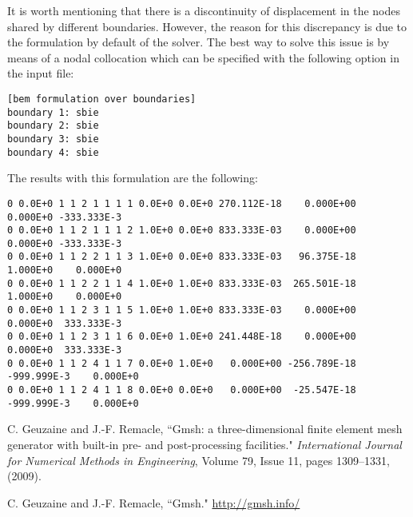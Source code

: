 \documentclass[A4]{article}
\begin{document}
It is worth mentioning that there is a discontinuity of displacement in the nodes shared by different boundaries. However, the reason for this discrepancy is due to the formulation by default of the solver. The best way to solve this issue is by means of a nodal collocation which can be specified with the following option in the input file: 

\begin{Verbatim}
[bem formulation over boundaries]
boundary 1: sbie
boundary 2: sbie
boundary 3: sbie
boundary 4: sbie
\end{Verbatim}

The results with this formulation are the following:

\begin{Verbatim}
0 0.0E+0 1 1 2 1 1 1 1 0.0E+0 0.0E+0 270.112E-18    0.000E+00    0.000E+0 -333.333E-3
0 0.0E+0 1 1 2 1 1 1 2 1.0E+0 0.0E+0 833.333E-03    0.000E+00    0.000E+0 -333.333E-3
0 0.0E+0 1 1 2 2 1 1 3 1.0E+0 0.0E+0 833.333E-03   96.375E-18    1.000E+0    0.000E+0
0 0.0E+0 1 1 2 2 1 1 4 1.0E+0 1.0E+0 833.333E-03  265.501E-18    1.000E+0    0.000E+0
0 0.0E+0 1 1 2 3 1 1 5 1.0E+0 1.0E+0 833.333E-03    0.000E+00    0.000E+0  333.333E-3
0 0.0E+0 1 1 2 3 1 1 6 0.0E+0 1.0E+0 241.448E-18    0.000E+00    0.000E+0  333.333E-3
0 0.0E+0 1 1 2 4 1 1 7 0.0E+0 1.0E+0   0.000E+00 -256.789E-18 -999.999E-3    0.000E+0
0 0.0E+0 1 1 2 4 1 1 8 0.0E+0 0.0E+0   0.000E+00  -25.547E-18 -999.999E-3    0.000E+0
\end{Verbatim}

\begin{thebibliography}{99}

	 C. Geuzaine and J.-F. Remacle, ``Gmsh: a three-dimensional finite element mesh generator with built-in pre- and post-processing facilities." \textit{International Journal for Numerical Methods in Engineering}, Volume 79, Issue 11, pages 1309--1331, (2009).
	
	  C. Geuzaine and J.-F. Remacle, ``Gmsh." \url{http://gmsh.info/}
	
\end{thebibliography}
\end{document}
